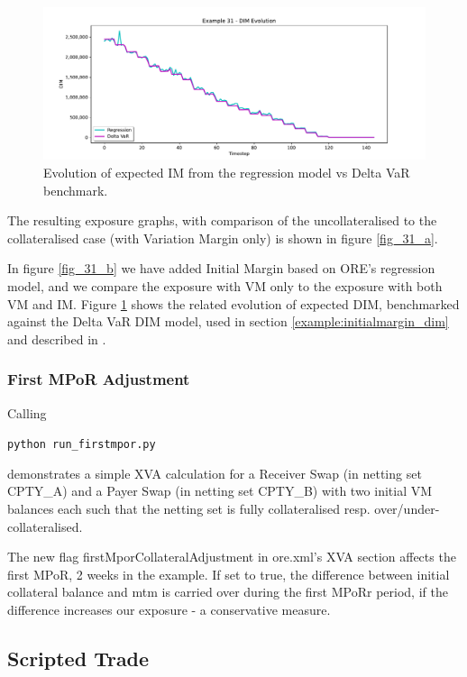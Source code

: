\begin{figure}[h!]
\begin{center}
\includegraphics[scale=0.45]{examples/mpl_closeout_dim_evolution.pdf}
\end{center}
\caption{Evolution of expected IM from the regression model vs Delta VaR benchmark.}
\label{fig_31_c}
\end{figure}

The resulting exposure graphs, with comparison of the uncollateralised to the collateralised
case (with Variation Margin only) is shown in figure \ref{fig_31_a}.

In figure \ref{fig_31_b} we have added Initial Margin based on ORE's regression model, and we compare the exposure with VM only to
the exposure with both VM and IM. Figure \ref{fig_31_c} shows the related evolution of expected DIM, benchmarked against the
Delta VaR DIM model, used in section \ref{example:initialmargin_dim} and described in \cite{methods}.

\subsubsection{First MPoR Adjustment}

Calling

\medskip
\centerline{\tt python run\_firstmpor.py} 
\medskip

demonstrates a simple XVA calculation for a Receiver Swap (in netting set CPTY\_A) and a Payer Swap (in netting set CPTY\_B)
with two initial VM balances each such that the netting set is fully collateralised resp. over/under-collateralised.

The new flag firstMporCollateralAdjustment in ore.xml's XVA section affects the first MPoR, 2 weeks in the example.
If set to true, the difference between initial collateral balance and mtm is carried over during the first MPoRr period,
if the difference increases our exposure - a conservative measure.

\subsection{Scripted Trade}\label{example:scriptedtrade}

